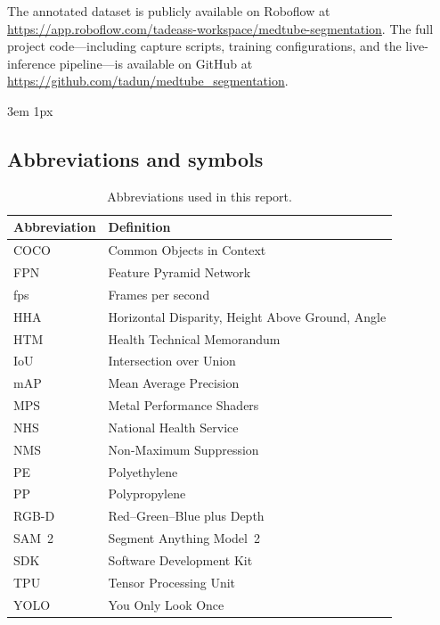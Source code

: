 \documentclass{Academic}
\begin{document}
The annotated dataset is publicly available on Roboflow at \url{https://app.roboflow.com/tadeass-workspace/medtube-segmentation}. The full project code---including capture scripts, training configurations, and the live-inference pipeline---is available on GitHub at \url{https://github.com/tadun/medtube_segmentation}.

\singlespacing
\emergencystretch 3em
\hfuzz 1px
\clearpage
\printbibliography[heading=bibnumbered]

\clearpage
\begin{appendices}

\section{Abbreviations and symbols}
\label{app:abbreviations}

\begin{table}[H]
  \centering
  \begin{tabular}{ll}
    \toprule
    \textbf{Abbreviation} & \textbf{Definition} \\
    \midrule
    COCO   & Common Objects in Context \\
    FPN    & Feature Pyramid Network \\
    fps    & Frames per second \\
    HHA    & Horizontal Disparity, Height Above Ground, Angle \\
    HTM    & Health Technical Memorandum \\
    IoU    & Intersection over Union \\
    mAP    & Mean Average Precision \\
    MPS    & Metal Performance Shaders \\
    NHS    & National Health Service \\
    NMS    & Non-Maximum Suppression \\
    PE     & Polyethylene \\
    PP     & Polypropylene \\
    RGB-D  & Red--Green--Blue plus Depth \\
    SAM~2  & Segment Anything Model~2 \\
    SDK    & Software Development Kit \\
    TPU    & Tensor Processing Unit \\
    YOLO   & You Only Look Once \\
    \bottomrule
  \end{tabular}
  \caption{Abbreviations used in this report.}
\end{table}


\end{appendices}
\end{document}

